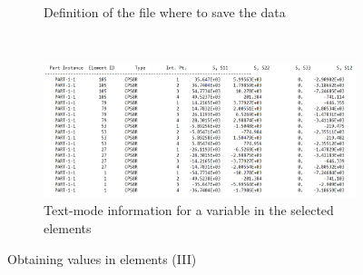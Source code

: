\begin{enumerate}
\begin{figure}[H]
\begin{subfigure}{0.32\textwidth}
     \caption{Definition of the file where to save the data}
     \label{figu93}
   \end{subfigure}%
   ~ %
   \begin{subfigure}{0.35\textwidth}
     \includegraphics[width=\textwidth]{./body/images/imagen94}
     \caption{Text-mode information for a variable in the selected
       elements}
     \label{figu94}
   \end{subfigure}%
   \caption{Obtaining values in elements (III)}
 \end{figure}


\end{enumerate}
